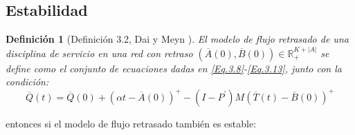 \documentclass{article}
\newtheorem{Def}{Definición}
\newcommand{\rea}{\mathbb{R}}
\begin{document}
\subsection{Estabilidad}

\begin{Def}[Definici\'on 3.2, Dai y Meyn \cite{DaiSean}]
El modelo de flujo retrasado de una disciplina de servicio en una
red con retraso
$\left(\overline{A}\left(0\right),\overline{B}\left(0\right)\right)\in\rea_{+}^{K+|A|}$
se define como el conjunto de ecuaciones dadas en
\ref{Eq.3.8}-\ref{Eq.3.13}, junto con la condici\'on:
\begin{equation}\label{CondAd.FluidModel}
\overline{Q}\left(t\right)=\overline{Q}\left(0\right)+\left(\alpha
t-\overline{A}\left(0\right)\right)^{+}-\left(I-P^{'}\right)M\left(\overline{T}\left(t\right)-\overline{B}\left(0\right)\right)^{+}
\end{equation}
\end{Def}

entonces si el modelo de flujo retrasado tambi\'en es estable:
\end{document}
